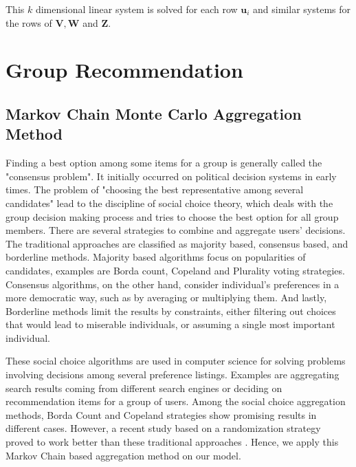 \documentclass[a4paper]{article}
\begin{document}
This $k$ dimensional linear system is solved for each row $\mathbf{u}_i$ and similar systems for the rows of $\mathbf{V}, \mathbf{W}$ and $\mathbf{Z}$.


\section{Group Recommendation}\label{sec:GroupRecommendation}

\subsection{Markov Chain Monte Carlo Aggregation Method}

Finding a best option among some items for a group is generally called the "consensus problem". It initially occurred on political decision systems in early times. The problem of "choosing the best representative among several candidates" lead to the discipline of social choice theory, which deals with the group decision making process and tries to choose the best option for all group members. There are several strategies to combine and aggregate users' decisions. The traditional approaches are classified as majority based, consensus based, and borderline methods\cite{Masthoff11}. Majority based algorithms focus on popularities of candidates, examples are Borda count, Copeland and Plurality voting strategies. Consensus algorithms, on the other hand, consider individual's preferences in a more democratic way, such as by averaging or multiplying them. And lastly, Borderline methods limit the results by constraints, either filtering out choices that would lead to miserable individuals, or assuming a single most important individual. 

These social choice algorithms  are used in computer science for solving problems involving decisions among several preference listings. Examples are aggregating search results coming from different search engines or deciding on recommendation items for a group of users. Among the social choice aggregation methods, Borda Count and Copeland strategies show promising results in different cases. However, a recent study based on a randomization strategy proved to work better than these traditional approaches \cite{Dwork03}. Hence, we apply this Markov Chain based aggregation method on our model. 
\end{document}
